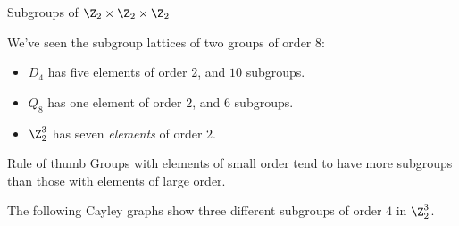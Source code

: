 \documentclass[8pt, handout]{beamer}
\newcommand{\Pause}{\pause}      %
\begin{document}

\begin{frame}{Subgroups of $\Z_2\times\Z_2\times\Z_2$} %
  
  We've seen the subgroup lattices of two groups of order $8$: \Pause
  \begin{itemize}
  \item $D_4$ has five elements of order $2$, and $10$ subgroups. \Pause
  \item $Q_8$ has one element of order $2$, and $6$ subgroups. \Pause
  \item $\Z_2^3$ has seven \emph{elements} of order $2$.
  \end{itemize}  
  
  \smallskip\Pause
  
  \begin{exampleblock}{Rule of thumb}
    Groups with elements of small order tend to have more subgroups
    than those with elements of large order.
  \end{exampleblock}
  
  \medskip\Pause
  
  The following Cayley graphs show three different subgroups of
  order $4$ in $\Z_2^3$.


\end{frame}
\end{document}
